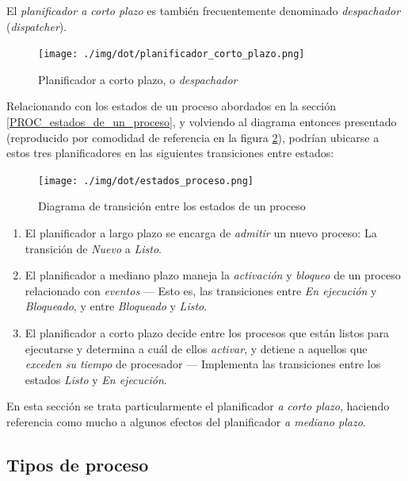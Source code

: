 \documentclass[11pt,fleqn]{book} %
\begin{document}
\begin{description}
		   El \emph{planificador a corto plazo} es también
                   frecuentemente denominado \emph{despachador}
                   (\emph{dispatcher}).

		   \begin{figure}[htb]
		   \centering
		   \texttt{[image: ./img/dot/planificador\_corto\_plazo.png]}
		   \caption{\label{PLAN_planificador_corto_plazo}Planificador a corto plazo, o \emph{despachador}}
		   \end{figure}
\end{description}

Relacionando con los estados de un proceso abordados en la
sección \ref{PROC_estados_de_un_proceso}, y volviendo al
diagrama entonces presentado (reproducido por comodidad de referencia
en la figura \ref{PLAN_estados_proceso}), podrían ubicarse a estos tres
planificadores en las siguientes transiciones entre estados:

\begin{figure}[htb]
\centering
\texttt{[image: ./img/dot/estados\_proceso.png]}
\caption{\label{PLAN_estados_proceso}Diagrama de transición entre los estados de un proceso}
\end{figure}

\begin{enumerate}
\item El planificador a largo plazo se encarga de \emph{admitir} un nuevo
   proceso: La transición de \emph{Nuevo} a \emph{Listo}.
\item El planificador a mediano plazo maneja la \emph{activación} y \emph{bloqueo}
   de un proceso relacionado con \emph{eventos} — Esto es, las transiciones
   entre \emph{En ejecución} y \emph{Bloqueado}, y entre \emph{Bloqueado} y \emph{Listo}.
\item El planificador a corto plazo decide entre los procesos que están
   listos para ejecutarse y determina a cuál de ellos \emph{activar}, y
   detiene a aquellos que \emph{exceden su tiempo} de procesador —
   Implementa las transiciones entre los estados \emph{Listo} y \emph{En    ejecución}.
\end{enumerate}

En esta sección se trata particularmente el planificador \emph{a corto plazo}, haciendo referencia como mucho a algunos efectos del
planificador \emph{a mediano plazo}.
\subsection{Tipos de proceso}
\label{sec-4-1-1}
\end{document}
